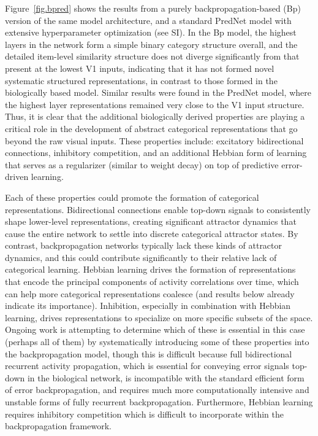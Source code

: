 \documentclass[12pt,twoside]{naturefigs}  %
\newif\myifpdf
\begin{document}
Figure~\ref{fig.bpred} shows the results from a purely backpropagation-based (Bp) version of the same model architecture, and a standard PredNet model\cite{LotterKreimanCox16} with extensive hyperparameter optimization (see SI).  In the Bp model, the highest layers in the network form a simple binary category structure overall, and the detailed item-level similarity structure does not diverge significantly from that present at the lowest V1 inputs, indicating that it has not formed novel systematic structured representations, in contrast to those formed in the biologically based model.  Similar results were found in the PredNet model, where the highest layer representations remained very close to the V1 input structure.  Thus, it is clear that the additional biologically derived properties are playing a critical role in the development of abstract categorical representations that go beyond the raw visual inputs. These properties include: excitatory bidirectional connections, inhibitory competition, and an additional Hebbian form of learning that serves as a regularizer (similar to weight decay) on top of predictive error-driven learning\cite{OReilly98,OReillyMunakata00}.

Each of these properties could promote the formation of categorical representations. Bidirectional connections enable top-down signals to consistently shape lower-level representations, creating significant attractor dynamics that cause the entire network to settle into discrete categorical attractor states. By contrast, backpropagation networks typically lack these kinds of attractor dynamics, and this could contribute significantly to their relative lack of categorical learning.  Hebbian learning drives the formation of representations that encode the principal components of activity correlations over time, which can help more categorical representations coalesce (and results below already indicate its importance).  Inhibition, especially in combination with Hebbian learning, drives representations to specialize on more specific subsets of the space.  Ongoing work is attempting to determine which of these is essential in this case (perhaps all of them) by systematically introducing some of these properties into the backpropagation model, though this is difficult because full bidirectional recurrent activity propagation, which is essential for conveying error signals top-down in the biological network, is incompatible with the standard efficient form of error backpropagation, and requires much more computationally intensive and unstable forms of fully recurrent backpropagation\cite{WilliamsZipser92,Pineda87}.  Furthermore, Hebbian learning requires inhibitory competition which is difficult to incorporate within the backpropagation framework.
\end{document}
